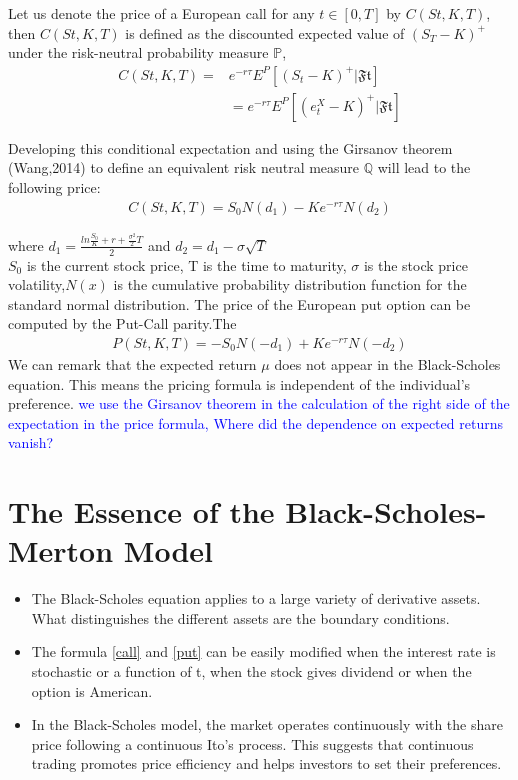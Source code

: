 \documentclass[12pt]{report}
\begin{document}
Let us denote the price of a European call for any $ t \in [0, T]$ by $C(St, K,T)$, then $C(St, K,T)$ is defined as the discounted expected value of $(S_T-K)^+$ under the risk-neutral probability measure $\mathbb{P}$,
\begin{align}
C(St, K,T)=& e^{-r \tau} E^P[(S_t-K)^+|\mathfrak{Ft}] \nonumber \\ 
&=e^{-r \tau} E^P[(e^X_t-K)^+|\mathfrak{Ft}] 
\end{align}

Developing this conditional expectation and using the Girsanov theorem (Wang,2014) to define an equivalent risk neutral measure $\mathbb{Q}$ will lead to the following price:
\begin{gather}
C(St,K,T)= S_0 N(d_1) - K e^{-r \tau} N(d_2)
\label{call}
\end{gather}

where $ d_1= \frac{ln\frac{S_0}{K}+r+\frac{\sigma^2}{2}T}{2} $ and $d_2 = d_1-\sigma \sqrt{T} $ \\
$ S_0$ is the current stock price, T is the time to maturity, $\sigma$ is the stock price volatility,$N(x)$ is the cumulative probability distribution function for the standard normal distribution. The price of the European put option can
be computed by the Put-Call parity.The 
\begin{gather}
P(St,K,T)= -S_0 N(-d_1) + K e^{-r \tau} N(-d_2)
\label{put}
\end{gather}
We can remark that the expected return $\mu$ does not appear in the Black-Scholes equation. This means the pricing formula is independent of the individual’s preference. 
\textcolor{blue}{we use the Girsanov theorem in the calculation of the right side of the expectation in the price formula, 
Where did the dependence on expected returns vanish? }

\section{The Essence  of the Black-Scholes-Merton Model}
\begin{itemize}

\item The Black-Scholes equation applies to a large variety of derivative assets. What distinguishes the different assets are the boundary conditions.
\item The formula \eqref{call} and \eqref{put} can be easily modified when the interest rate is stochastic or a function of t, when the stock gives dividend or when the option is American.

\item  In the Black-Scholes model, the market operates continuously with the share price following a continuous Ito’s process.  This suggests that continuous trading promotes price efficiency and helps investors to set their preferences.
\end{itemize}
\end{document}
